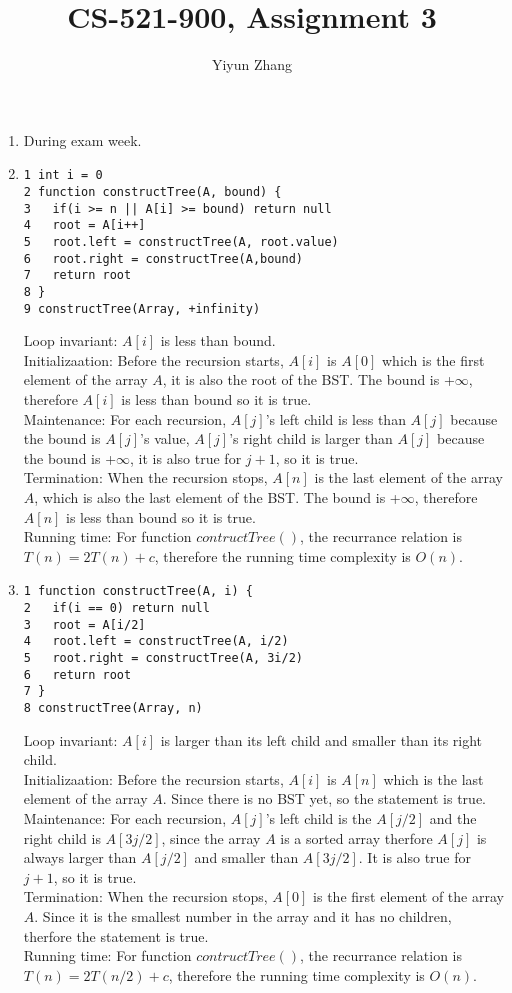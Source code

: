 \documentclass{article}
\title{CS-521-900, Assignment 3}
\author{Yiyun Zhang}
\begin{document}
\maketitle
\begin{enumerate}

\item
During exam week.

\item
\begin{verbatim}
1 int i = 0
2 function constructTree(A, bound) {
3   if(i >= n || A[i] >= bound) return null
4   root = A[i++]
5   root.left = constructTree(A, root.value)
6   root.right = constructTree(A,bound)
7   return root
8 }
9 constructTree(Array, +infinity)
\end{verbatim}
Loop invariant: $A[i]$ is less than bound. \\
Initializaation: Before the recursion starts, $A[i]$ is $A[0]$ which is the first element of the array $A$, it is also the root of the BST. The bound is +$\infty$, therefore $A[i]$ is less than bound so it is true. \\
Maintenance: For each recursion, $A[j]$'s left child is less than $A[j]$ because the bound is $A[j]$'s value, $A[j]$'s right child is larger than $A[j]$ because the bound is +$\infty$, it is also true for $j+1$, so it is true. \\
Termination: When the recursion stops, $A[n]$ is the last element of the array $A$, which is also the last element of the BST. The bound is +$\infty$, therefore $A[n]$ is less than bound so it is true. \\
Running time: For function $contructTree()$, the recurrance relation is $T(n) = 2T(n) + c$, therefore the running time complexity is $O(n)$.

\item
\begin{verbatim}
1 function constructTree(A, i) {
2   if(i == 0) return null
3   root = A[i/2]
4   root.left = constructTree(A, i/2)
5   root.right = constructTree(A, 3i/2)
6   return root
7 }
8 constructTree(Array, n)
\end{verbatim}
Loop invariant: $A[i]$ is larger than its left child and smaller than its right child. \\
Initializaation: Before the recursion starts, $A[i]$ is $A[n]$ which is the last element of the array $A$. Since there is no BST yet, so the statement is true. \\
Maintenance: For each recursion, $A[j]$'s left child is the $A[j/2]$ and the right child is $A[3j/2]$, since the array $A$ is a sorted array therfore $A[j]$ is always larger than $A[j/2]$ and smaller than $A[3j/2]$. It is also true for $j+1$, so it is true. \\
Termination: When the recursion stops, $A[0]$ is the first element of the array $A$. Since it is the smallest number in the array and it has no children, therfore the statement is true. \\
Running time: For function $contructTree()$, the recurrance relation is $T(n) = 2T(n/2) + c$, therefore the running time complexity is $O(n)$. \\


\end{enumerate}
\end{document}
